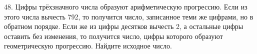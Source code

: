 48. Цифры трёхзначного числа образуют арифметическую прогрессию. Если из этого числа вычесть 792, то получится число, записанное теми же цифрами, но в обратном порядке. Если же из цифры десятков вычесть 2, а остальные цифры оставить без изменения, то получится число, цифры которого образуют геометрическую прогрессию. Найдите исходное число.\\
